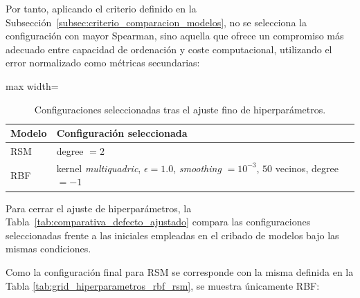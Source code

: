 Por tanto, aplicando el criterio definido en la Subsección~\ref{subsec:criterio_comparacion_modelos}, no se selecciona la configuración con mayor Spearman, sino aquella que ofrece un compromiso más adecuado entre capacidad de ordenación y coste computacional, utilizando el error normalizado como métricas secundarias:

\begin{table}[H]
    \centering
    \small
    \begin{adjustbox}{max width=\textwidth}
        \begin{tabular}{ll}
            \toprule
            \textbf{Modelo} & \textbf{Configuración seleccionada}                                                                             \\
            \midrule
            RSM             & degree \(=2\)                                                                                                   \\
            RBF             & kernel \textit{multiquadric}, \(\epsilon=1.0\), \textit{smoothing} \(=10^{-3}\), \(50\) vecinos, degree \(=-1\) \\
            \bottomrule
        \end{tabular}
    \end{adjustbox}
    \caption{Configuraciones seleccionadas tras el ajuste fino de hiperparámetros.}
    \label{tab:configuraciones_finales_ajuste_fino}
\end{table}

Para cerrar el ajuste de hiperparámetros, la Tabla~\ref{tab:comparativa_defecto_ajustado} compara las configuraciones seleccionadas frente a las iniciales empleadas en el cribado de modelos bajo las mismas condiciones.

Como la configuración final para RSM se corresponde con la misma definida en la Tabla \ref{tab:grid_hiperparametros_rbf_rsm}, se muestra únicamente RBF:

